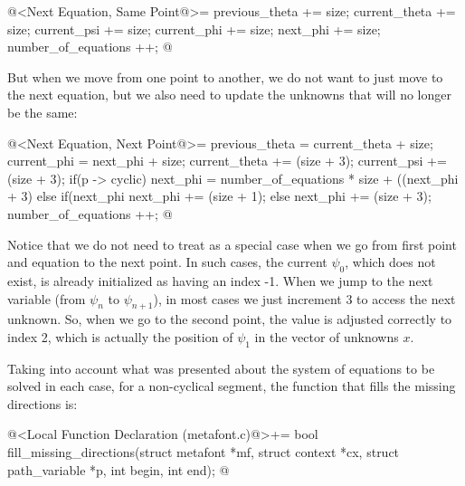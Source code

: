 \iniciocodigo
@<Next Equation, Same Point@>=
{
  previous_theta += size;
  current_theta += size;
  current_psi += size;
  current_phi += size;
  next_phi += size;
  number_of_equations ++;
}
@
\fimcodigo

But when we move from one point to another, we do not want to just
move to the next equation, but we also need to update the unknowns
that will no longer be the same:

\iniciocodigo
@<Next Equation, Next Point@>=
{
  previous_theta = current_theta + size;
  current_phi = next_phi + size;
  current_theta += (size + 3);
  current_psi += (size + 3);
  if(p -> cyclic)
    next_phi = number_of_equations * size + ((next_phi + 3) %
  else{
    if(next_phi %
      next_phi += (size + 1);
    else
      next_phi += (size + 3);
  }
  number_of_equations ++;
}
@
\fimcodigo

Notice that we do not need to treat as a special case when we go from
first point and equation to the next point. In such cases, the current
$\psi_0$, which does not exist, is already initialized as having an
index -1. When we jump to the next variable (from $\psi_{n}$ to
$\psi_{n+1}$), in most cases we just increment 3 to access the next
unknown. So, when we go to the second point, the value is adjusted
correctly to index 2, which is actually the position of $\psi_1$ in
the vector of unknowns $x$.

Taking into account what was presented about the system of equations
to be solved in each case, for a non-cyclical segment, the function
that fills the missing directions is:

\iniciocodigo
@<Local Function Declaration (metafont.c)@>+=
bool fill_missing_directions(struct metafont *mf, struct context *cx,
                             struct path_variable *p, int begin, int end);
@
\fimcodigo

